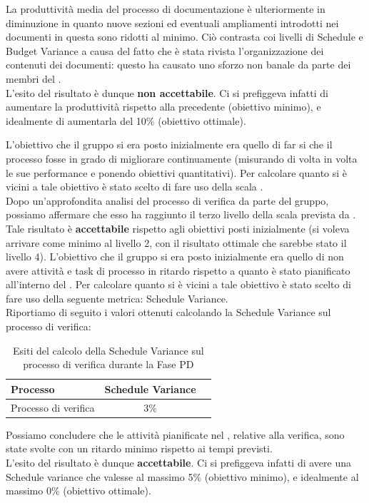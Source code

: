 				La produttività media del processo di documentazione è ulteriormente in diminuzione in quanto nuove sezioni ed eventuali ampliamenti introdotti nei documenti in questa  sono ridotti al minimo. Ciò contrasta coi livelli di Schedule e Budget Variance a causa del fatto che è stata rivista l'organizzazione dei contenuti dei documenti: questo ha causato uno sforzo non banale da parte dei membri del .\\
				L'esito del risultato è dunque \textbf{non accettabile}. Ci si prefiggeva infatti di aumentare la produttività rispetto alla  precedente (obiettivo minimo), e idealmente di aumentarla del 10\% (obiettivo ottimale).

				L'obiettivo che il gruppo si era posto inizialmente era quello di far si che il processo fosse in grado di migliorare continuamente (misurando di volta in volta le sue performance e ponendo obiettivi quantitativi). Per calcolare quanto si è vicini a tale obiettivo è stato scelto di fare uso della scala .\\
				Dopo un'approfondita analisi del processo di verifica da parte del gruppo, possiamo affermare che esso ha raggiunto il terzo livello della scala prevista da .\\
				Tale risultato è \textbf{accettabile} rispetto agli obiettivi posti inizialmente (si voleva arrivare come minimo al livello 2, con il risultato ottimale che sarebbe stato il livello 4).
				L'obiettivo che il gruppo si era posto inizialmente era quello di non avere attività e task di processo in ritardo rispetto a quanto è stato pianificato all'interno del . Per calcolare quanto si è vicini a tale obiettivo è stato scelto di fare uso della seguente metrica: Schedule Variance.\\
				Riportiamo di seguito i valori ottenuti calcolando la Schedule Variance sul processo di verifica:
				\begin{table}[H]
					\centering
					\begin{tabu}{| l | c | c |}
						\hline
						Processo 			   & Schedule Variance   \\ \hline \hline
						Processo di verifica   & 3\%                 \\ \hline
					\end{tabu}
					\caption{Esiti del calcolo della Schedule Variance sul processo di verifica durante la Fase PD}
				\end{table}
				Possiamo concludere che le attività pianificate nel , relative alla verifica, sono state svolte con un ritardo minimo rispetto ai tempi previsti.\\
				L'esito del risultato è dunque \textbf{accettabile}. Ci si prefiggeva infatti di avere una Schedule variance che valesse al massimo 5\% (obiettivo minimo), e idealmente al massimo 0\% (obiettivo ottimale).	

